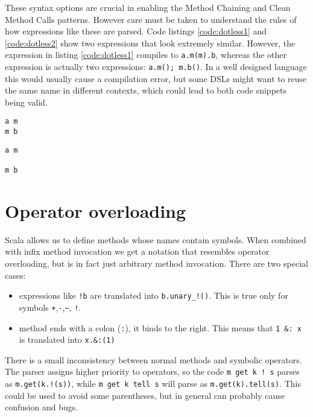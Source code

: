 These syntax options are crucial in enabling the Method Chaining and Clean Method Calls patterns. However care must be taken to understand the rules of how expressions like these are parsed. Code listings \ref{code:dotless1} and \ref{code:dotless2} show two expressions that look extremely similar. However, the expression in listing \ref{code:dotless1} compiles to \texttt{a.m(m).b}, whereas the other expression is actually two expressions: \texttt{a.m(); m.b()}. In a well designed language this would usually cause a compilation error, but some DSLs might want to reuse the same name in different contexts, which could lead to both code snippets being valid.

\begin{minipage}[t]{0.4\textwidth}
\begin{lstlisting}[label=code:dotless1]
a m
m b
\end{lstlisting}
\end{minipage}\hfill
\begin{minipage}[t]{0.4\textwidth}
\begin{lstlisting}[label=code:dotless2]
a m

m b
\end{lstlisting}
\end{minipage}

\section{Operator overloading}

Scala allows us to define methods whose names contain symbols. When combined with infix method invocation we get a notation that resembles operator overloading, but is in fact just arbitrary method invocation. There are two special cases: 
\begin{itemize}
	\item expressions like \texttt{!b} are translated into \texttt{b.unary\_!()}. This is true only for symbols \texttt{+},\texttt{-},\texttt{\~}, \texttt{!}.
	\item method ends with a colon (\texttt{:}), it binds to the right. This means that \texttt{1 \&: x} is translated into \texttt{x.\&:(1)}
\end{itemize}

There is a small inconsistency between normal methods and symbolic operators. The parser assigns higher priority to operators, so the code \texttt{m get k ! s} parses as \texttt{m.get(k.!(s))}, while \texttt{m get k tell s} will parse as \texttt{m.get(k).tell(s)}. This could be used to avoid some parentheses, but in general can probably cause confusion and bugs.

